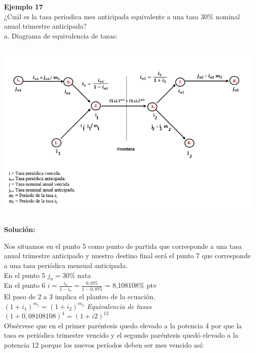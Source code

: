 \textbf{Ejemplo 17}\\

¿Cuál es la tasa periodica mes anticipada equivalente a una tasa 30\% nominal anual trimestre anticipada?\\

a. Diagrama de equivalencia de tasas:\\

\begin{center}
		\includegraphics[height = 9.0cm]{general}\\
\end{center}

\textbf{Solución:}

Nos situamos en el punto 5 como punto de partida que corresponde a una tasa anual trimestre anticipado y nuestro destino final será el punto 7 que corresponde a una tasa periódica mensual anticipada.\\

En el punto 5 $ j_{a} =30\%$ nata\\
En el punto 6 $i = \frac{i_{a}}{1-i_{a}} = \frac{0,075}{1-0,075}$ = 8,108108\% ptv\\

El paso de 2 a 3 implica el planteo de la ecuación.\\


$(1+i_{1})^{m_{1}} =(1+i_{2})^{m_{2}}$ \hspace{35 pt} \textit{Equivalencia de tasas}\\
$(1+0,08108108)^4 = (1 + i2)^{12}$\\

Obsérvese que en el primer paréntesis quedo elevado a la potencia 4 por que la tasa es periódica trimestre vencido y el segundo paréntesis quedó elevado a la potencia 12 porque los nuevos períodos deben ser mes vencido así:\\

